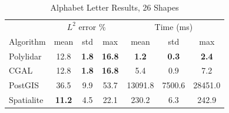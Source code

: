  
\begin{table}[!ht]
\centering
\caption{Alphabet Letter Results, 26 Shapes}
\label{table:alphabet_tests}
\begin{tabular}{lcccccc}
\toprule
{} & \multicolumn{3}{c}{$L^2$ error \%} & \multicolumn{3}{c}{Time (ms)} \\
{Algorithm} &    mean & std &  max &      mean &     std &     max \\
\midrule
Polylidar  &           12.8 & \textbf{1.8} & \textbf{16.8} &       \textbf{1.2} &    \textbf{0.3} &     \textbf{2.4} \\
CGAL       &           12.8 & \textbf{1.8} & \textbf{16.8} &       5.4 &    0.9 &     7.2 \\
PostGIS    &           36.5 & 9.9 & 53.7 &   13091.8 & 7500.6 & 28451.0 \\
Spatialite &           \textbf{11.2} & 4.5 & 22.1 &     230.2 &    6.3 &   242.9 \\
\bottomrule
\end{tabular}
\end{table}


